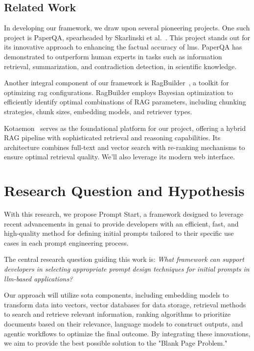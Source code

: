 \documentclass[12pt,twoside,english]{article}
\begin{document}
\subsection{Related Work}

In developing our framework, we draw upon several pioneering projects. One such project is PaperQA, spearheaded by Skarlinski et al.~\cite{Skarlinski2024PaperQA}. This project stands out for its innovative approach to enhancing the factual accuracy of \glspl{lm}. PaperQA has demonstrated to outperform human experts in tasks such as information retrieval, summarization, and contradiction detection, in scientific knowledge.

Another integral component of our framework is RagBuilder~\cite{KruxAI2024RagBuilder}, a toolkit for optimizing \gls{rag} configurations. RagBuilder employs Bayesian optimization to efficiently identify optimal combinations of RAG parameters, including chunking strategies, chunk sizes, embedding models, and retriever types. 

Kotaemon~\cite{Cinnamon2024Kotaemon} serves as the foundational platform for our project, offering a hybrid RAG pipeline with sophisticated retrieval and reasoning capabilities. Its architecture combines full-text and vector search with re-ranking mechanisms to ensure optimal retrieval quality. We'll also leverage its modern web interface.

\clearpage

\section{Research Question and Hypothesis}

With this research, we propose Prompt Start, a framework designed to leverage recent advancements in \gls{genai} to provide developers with an efficient, fast, and high-quality method for defining initial prompts tailored to their specific use cases in each prompt engineering process.

The central research question guiding this work is:  
\textit{What framework can support developers in selecting appropriate prompt design techniques for initial prompts in \gls{llm}-based applications?}

Our approach will utilize \gls{sota} components, including embedding models to transform data into vectors, vector databases for data storage, retrieval methods to search and retrieve relevant information, ranking algorithms to prioritize documents based on their relevance, language models to construct outputs, and agentic workflows to optimize the final outcome. By integrating these innovations, we aim to provide the best possible solution to the "Blank Page Problem."
\end{document}
